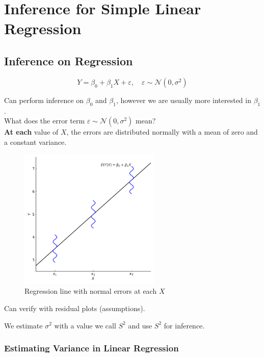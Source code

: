 \setcounter{chapter}{15}
\chapter{Inference for Simple Linear Regression}

\section{Inference on Regression}

\[
Y = \beta_0 + \beta_1 X + \varepsilon, \quad \varepsilon \sim \mathcal{N}(0, \sigma^2)
\]

Can perform inference on $\beta_0$ and $\beta_1$, however we are usually more interested in $\beta_1$. \\

What does the error term $\varepsilon \sim \mathcal{N}(0, \sigma^2)$ mean? \\
\textbf{At each} value of $X$, the errors are distributed normally with a mean of zero and a constant variance.

\begin{figure}[H]
  \centering
  \includegraphics[width=0.6\textwidth]{section16/images/regression_model.pdf}
  \caption{Regression line with normal errors at each $X$}
\end{figure}

Can verify with residual plots (assumptions).

We estimate $\sigma^2$ with a value we call $S^2$ and use $S^2$ for inference.

\subsection*{Estimating Variance in Linear Regression}

